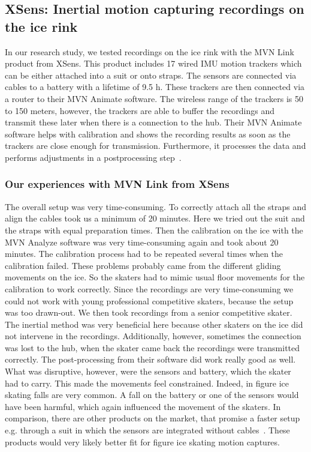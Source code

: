 \subsection{XSens: Inertial motion capturing recordings on the ice rink}
In our research study, we tested recordings on the ice rink with the MVN Link product from XSens.
This product includes 17 wired IMU motion trackers which can be either attached into a suit or onto straps.
The sensors are connected via cables to a battery with a lifetime of 9.5 h.
These trackers are then connected via a router to their MVN Animate software.
The wireless range of the trackers is 50 to 150 meters, however, the trackers are able to buffer the recordings
and transmit these later when there is a connection to the hub.
Their MVN Animate software helps with calibration and shows the recording results as soon as the trackers are close
enough
for transmission.
Furthermore, it processes the data and performs adjustments in a postprocessing step~\cite{xsensmvnanimate}.



\subsubsection*{Our experiences with MVN Link from XSens}
The overall setup was very time-consuming. To correctly attach all the straps and align the cables took us a
minimum of 20 minutes. Here we tried out the suit and the straps with equal preparation times.
Then the calibration on the ice with the MVN Analyze software was very time-consuming again and took about 20 minutes.
The calibration process had to be repeated several times when the calibration failed.
These problems probably came from the different gliding movements on the ice.
So the skaters had to mimic usual floor movements for the calibration to work correctly.
Since the recordings are very time-consuming we could not work with young professional competitive skaters, because
the setup was too drawn-out.
We then took recordings from a senior competitive skater. The inertial method was very beneficial here because other
skaters on the ice did not intervene in the recordings. Additionally, however, sometimes the connection was lost to
the hub, when the skater came back the recordings were transmitted correctly.
The post-processing from their software did work really good as well.
What was disruptive, however, were the sensors and battery, which the skater had to carry.
This made the movements feel constrained. Indeed, in figure ice skating falls are very common.
A fall on the battery or one of the sensors would have been harmful, which again influenced the movement of the
skaters.
In comparison, there are other products on the market, that promise a faster setup e.g. through a suit in which the
sensors
are integrated without cables~\cite{mocapinterialneuron}. These products would very likely better fit for figure ice
skating
motion captures.



